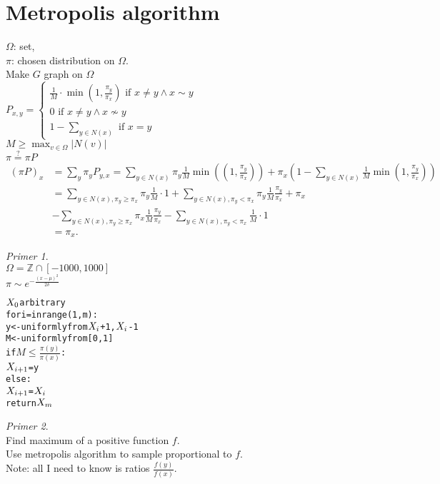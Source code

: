 \documentclass[a4paper, 12pt]{book}
\theoremstyle{definition}
\theoremstyle{remark}
\newtheorem*{ex}{Primer}
\newcommand{\Z}{\mathbb{Z}}
\begin{document}
\section{Metropolis algorithm}

$\Omega$: set, \\
$\pi$: chosen distribution on $\Omega$. \\
Make $G$ graph on $\Omega$ \\
$P_{x,y} = \begin{cases}
  \frac{1}{M} \cdot \min \left(1, \frac{\pi_y}{\pi_x}\right) \text{ if } x \neq y \land x \sim y \\
  0 \text{ if } x \neq y \land x \nsim y \\
  1 - \sum_{y \in N(x)} \text{ if } x = y
\end{cases}$ \\
$M \geq \max_{v \in \Omega} |N(v)|$ \\
$\pi \stackrel{?}{=} \pi P$ \\
\begin{align*}
  (\pi P)_x &= \sum_y \pi_y P_{y,x} =
    \sum_{y \in N(x)} \pi_y \frac{1}{M} \min \left(\left(1, \frac{\pi_y}{\pi_x}\right)\right)
    + \pi_x \left(1 - \sum_{y \in N(x)} \frac{1}{M} \min \left(1, \frac{\pi_y}{\pi_x}\right)\right) \\
  &= \sum_{y \in N(x), \pi_y \geq \pi_x} \pi_y \frac{1}{M} \cdot 1 +
    \sum_{y \in N(x), \pi_y < \pi_x} \pi_y \frac{1}{M} \frac{\pi_y}{\pi_x} + \pi_x \\
  &- \sum_{y \in N(x), \pi_y \geq \pi_x} \pi_x \frac{1}{M} \frac{\pi_y}{\pi_x} -
    \sum_{y \in N(x), \pi_y < \pi_x} \frac{1}{M} \cdot 1 \\
  &= \pi_x.
\end{align*}
\begin{ex} \text{} \\
  $\Omega = \Z \cap [-1000,1000]$ \\
  $\pi \sim e^{-\frac{(x-\mu)^2}{2 \delta}}$ \\
  \begin{alltt}
    \(X\sb{0}\) arbitrary
    for i = in range(1,m):
      y <- uniformly from {\(X\sb{i}\)+1,\(X\sb{i}\)-1}
      M <- uniformly from [0,1]
      if \(M \leq \frac{\pi(y)}{\pi(x)}\):
        \(X\sb{i+1}\) = y
      else:
        \(X\sb{i+1}\) = \(X\sb{i}\)
    return \(X\sb{m}\)
  \end{alltt}
\end{ex}
\begin{ex} \text{} \\
  Find maximum of a positive function $f$. \\
  Use metropolis algorithm to sample proportional to $f$. \\
  Note: all I need to know is ratios $\frac{f(y)}{f(x)}$.
\end{ex}
\end{document}
